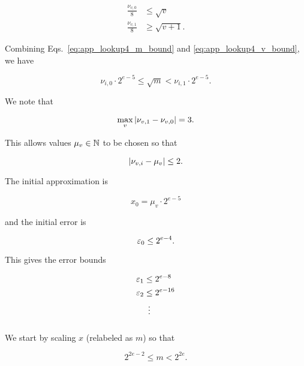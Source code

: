 \begin{align}
    \frac{\nu_{v,0}}{8} &\le \sqrt{v} \nonumber\\
    \frac{\nu_{v,1}}{8} &\ge \sqrt{v+1}.
    \label{eq:app_lookup4_v_bound}
\end{align}

\noindent
Combining Eqs.~\eqref{eq:app_lookup4_m_bound} and
\eqref{eq:app_lookup4_v_bound},
we have

\begin{equation}
    \nu_{i,0}\cdot2^{e-5} \le \sqrt{m} < \nu_{i,1}\cdot2^{e-5}.
\end{equation}

\noindent
We note that

\begin{equation}
    \max_{v} \left| \nu_{v,1} - \nu_{v,0} \right| = 3.
\end{equation}

\noindent
This allows values $\mu_{v}\in\mathbb{N}$ to be chosen so that

\begin{equation}
    \left| \nu_{v,i} - \mu_{v} \right| \le 2.
\end{equation}

The initial approximation is

\begin{equation}
    x_{0} = \mu_{v}\cdot2^{e-5}
\end{equation}

\noindent
and the initial error is

\begin{equation}
    \varepsilon_{0} \le 2^{e-4}.
\end{equation}

\noindent
This gives the error bounds

\begin{align}
    \varepsilon_{1} &\le 2^{e-8} \nonumber\\
    \varepsilon_{2} &\le 2^{e-16} \nonumber\\
        &\ \vdots
\end{align}


\subsubsection{\LookupEight{}}
\label{app:error_bounds:lookup8}

We start by scaling $x$ (relabeled as $m$) so that

\begin{equation}
    2^{2e-2} \le m < 2^{2e}.
\end{equation}

